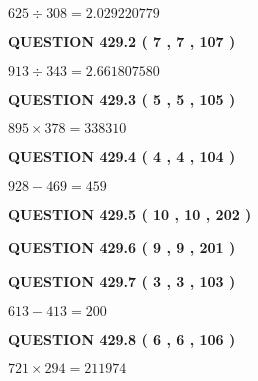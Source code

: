 \documentclass{ctexart}
\begin{document}
  
 
 

$ %
625 \div  %
308=   %
2.029220779$
 
 
  
\vspace{0.2in}
  
{\textbf{\Large{QUESTION
429.2 
 ( 7 , 7 , 107 )
}}}
  
  
 
 

$ %
913 \div  %
343=   %
2.661807580$
 
 
  
\vspace{0.2in}
  
{\textbf{\Large{QUESTION
429.3 
 ( 5 , 5 , 105 )
}}}
  
  
 
 

$ %
895 \times  %
378=   %
338310$
 
 
  
\vspace{0.2in}
  
{\textbf{\Large{QUESTION
429.4 
 ( 4 , 4 , 104 )
}}}
  
  
 
 

$ %
928 -  %
469=   %
459$
 
 
  
\vspace{0.2in}
  
{\textbf{\Large{QUESTION
429.5 
 ( 10 , 10 , 202 )
}}}
  
  
  
\vspace{0.2in}
  
{\textbf{\Large{QUESTION
429.6 
 ( 9 , 9 , 201 )
}}}
  
  
  
\vspace{0.2in}
  
{\textbf{\Large{QUESTION
429.7 
 ( 3 , 3 , 103 )
}}}
  
  
 
 

$ %
613 -  %
413=   %
200$
 
 
  
\vspace{0.2in}
  
{\textbf{\Large{QUESTION
429.8 
 ( 6 , 6 , 106 )
}}}
  
  
 
 

$ %
721 \times  %
294=   %
211974$
 
\end{document}
